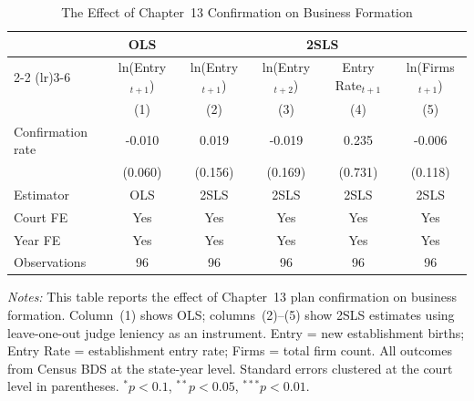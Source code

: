 \begin{table}[htbp]
\centering
\caption{The Effect of Chapter~13 Confirmation on Business Formation}
\label{tab:main_results}
\begin{threeparttable}
\small
\begin{tabular}{lccccc}
\toprule
 & OLS & \multicolumn{4}{c}{2SLS} \\
\cmidrule(lr){2-2} \cmidrule(lr){3-6}
 & ln(Entry$_{t+1}$) & ln(Entry$_{t+1}$) & ln(Entry$_{t+2}$) & Entry Rate$_{t+1}$ & ln(Firms$_{t+1}$) \\
 & (1) & (2) & (3) & (4) & (5) \\
\midrule
Confirmation rate & -0.010 & 0.019 & -0.019 & 0.235 & -0.006 \\
 & (0.060) & (0.156) & (0.169) & (0.731) & (0.118) \\
\midrule
Estimator & OLS & 2SLS & 2SLS & 2SLS & 2SLS \\
Court FE & Yes & Yes & Yes & Yes & Yes \\
Year FE & Yes & Yes & Yes & Yes & Yes \\
Observations & 96 & 96 & 96 & 96 & 96 \\
\bottomrule
\end{tabular}
\begin{tablenotes}
\small
\item \textit{Notes:} This table reports the effect of Chapter~13 plan confirmation on business formation. Column~(1) shows OLS; columns~(2)--(5) show 2SLS estimates using leave-one-out judge leniency as an instrument. Entry = new establishment births; Entry Rate = establishment entry rate; Firms = total firm count. All outcomes from Census BDS at the state-year level. Standard errors clustered at the court level in parentheses. $^{*}p<0.1$, $^{**}p<0.05$, $^{***}p<0.01$.
\end{tablenotes}
\end{threeparttable}
\end{table}
